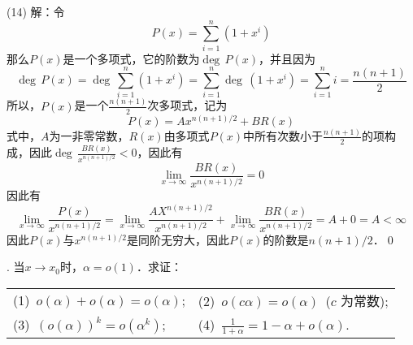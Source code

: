 (14) 解：令
\begin{equation}
    P(x) = \sum_{i=1}^n (1+x^i)
\end{equation}
那么$P(x)$是一个多项式，它的阶数为$\deg \, P(x)$，并且因为
\begin{equation}
    \deg \, P(x) = \deg \, \sum_{i=1}^n (1+x^i) = \sum_{i=1}^n \deg \, (1+x^i) = \sum_{i=1}^n i = \frac{n(n+1)}{2}
\end{equation}
所以，$P(x)$是一个$\displaystyle\frac{n(n+1)}{2}$次多项式，记为
\begin{equation}
    P(x) = A x^{n(n+1)/2} + B R(x)
\end{equation}
式中，$A$为一非零常数，$R(x)$由多项式$P(x)$中所有次数小于$\displaystyle\frac{n(n+1)}{2}$的项构成，因此$\deg \, \displaystyle\frac{BR(x)}{x^{n(n+1)/2}} < 0$，因此有
\begin{equation}
    \lim_{x \to \infty} \frac{BR(x)}{x^{n(n+1)/2}} = 0
\end{equation}
因此有
\begin{equation}
    \lim_{x \to \infty} \frac{P(x)}{x^{n(n+1)/2}} = \lim_{x \to \infty} \frac{A X^{n(n+1)/2}}{x^{n(n+1)/2}} + \lim_{x \to \infty} \frac{BR(x)}{x^{n(n+1)/2}} = A + 0 = A < \infty
\end{equation}
因此$P(x)$与$x^{n(n+1)/2}$是同阶无穷大，因此$P(x)$的阶数是$n(n+1)/2$．\qed

. 当$x \to x_0$时，$\alpha = o(1)$．求证：
\begin{table}[H]
    \centering
    \begin{tabularx}{\textwidth} {  >{\raggedright\arraybackslash}X >{\raggedright\arraybackslash}X  }
        (1)~$o(\alpha) + o(\alpha) = o(\alpha)$; & (2)~$o(c\alpha) = o(\alpha)$~($c$ 为常数); \\ [1em]
        (3)~$(o(\alpha))^k = o(\alpha^k)$; & (4)~$\displaystyle\frac{1}{1+\alpha} = 1 - \alpha + o(\alpha)$.
    \end{tabularx}
\end{table}

